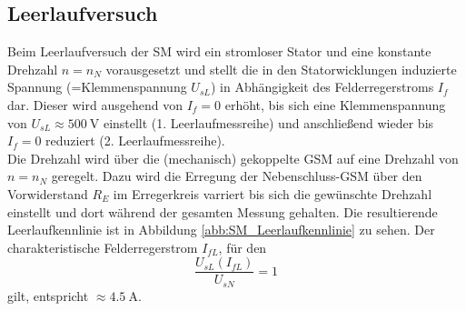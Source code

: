 \subsection{Leerlaufversuch}
Beim Leerlaufversuch der SM wird ein stromloser Stator und eine konstante Drehzahl $n=n_N$ vorausgesetzt und stellt die in den Statorwicklungen induzierte Spannung (=Klemmenspannung $U_{sL}$) in Abhängigkeit des Felderregerstroms $I_f$ dar. Dieser wird ausgehend von $I_f=0$ erhöht, bis sich eine Klemmenspannung von $U_{sL}\approx\SI{500}{\volt}$ einstellt (1. Leerlaufmessreihe) und anschließend wieder bis $I_f=0$ reduziert (2. Leerlaufmessreihe).\\
Die Drehzahl wird über die (mechanisch) gekoppelte GSM auf eine Drehzahl von $n=n_N$ geregelt. Dazu wird die Erregung der Nebenschluss-GSM über den Vorwiderstand $R_E$ im Erregerkreis varriert bis sich die gewünschte Drehzahl einstellt und dort während der gesamten Messung gehalten. Die resultierende Leerlaufkennlinie ist in Abbildung \ref{abb:SM_Leerlaufkennlinie} zu sehen. Der charakteristische Felderregerstrom $I_{fL}$, für den
\begin{equation*}
    \frac{U_{sL}(I_{fL})}{U_{sN}} = 1 
\end{equation*}
gilt, entspricht $\approx\SI{4.5}{\ampere}$.


